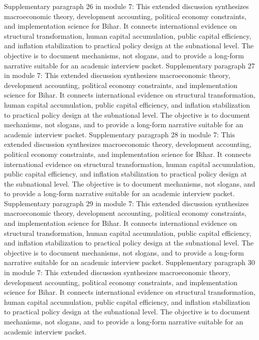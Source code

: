 \documentclass[preprint,12pt]{elsarticle}
\begin{document}
Supplementary paragraph 26 in module 7: This extended discussion synthesizes macroeconomic theory, development accounting, political economy constraints, and implementation science for Bihar. It connects international evidence on structural transformation, human capital accumulation, public capital efficiency, and inflation stabilization to practical policy design at the subnational level. The objective is to document mechanisms, not slogans, and to provide a long-form narrative suitable for an academic interview packet.
Supplementary paragraph 27 in module 7: This extended discussion synthesizes macroeconomic theory, development accounting, political economy constraints, and implementation science for Bihar. It connects international evidence on structural transformation, human capital accumulation, public capital efficiency, and inflation stabilization to practical policy design at the subnational level. The objective is to document mechanisms, not slogans, and to provide a long-form narrative suitable for an academic interview packet.
Supplementary paragraph 28 in module 7: This extended discussion synthesizes macroeconomic theory, development accounting, political economy constraints, and implementation science for Bihar. It connects international evidence on structural transformation, human capital accumulation, public capital efficiency, and inflation stabilization to practical policy design at the subnational level. The objective is to document mechanisms, not slogans, and to provide a long-form narrative suitable for an academic interview packet.
Supplementary paragraph 29 in module 7: This extended discussion synthesizes macroeconomic theory, development accounting, political economy constraints, and implementation science for Bihar. It connects international evidence on structural transformation, human capital accumulation, public capital efficiency, and inflation stabilization to practical policy design at the subnational level. The objective is to document mechanisms, not slogans, and to provide a long-form narrative suitable for an academic interview packet.
Supplementary paragraph 30 in module 7: This extended discussion synthesizes macroeconomic theory, development accounting, political economy constraints, and implementation science for Bihar. It connects international evidence on structural transformation, human capital accumulation, public capital efficiency, and inflation stabilization to practical policy design at the subnational level. The objective is to document mechanisms, not slogans, and to provide a long-form narrative suitable for an academic interview packet.
\end{document}
